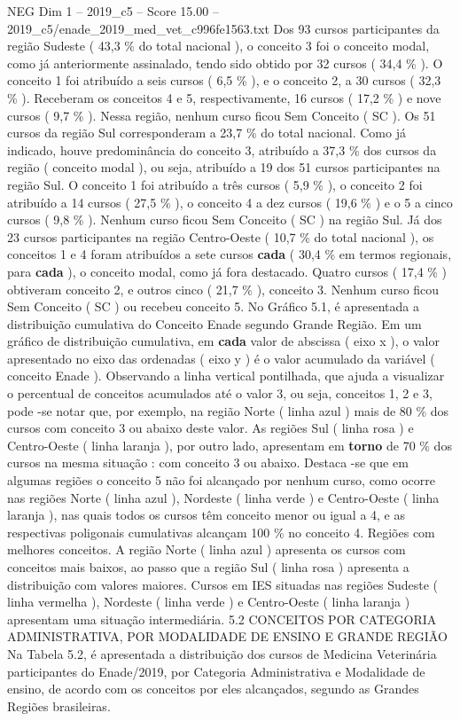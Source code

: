 \begin{textsample}{NEG Dim 1 – 2019\_c5 – Score 15.00 – 2019\_c5/enade\_2019\_med\_vet\_c996fe1563.txt}
Dos 93 cursos participantes da região Sudeste ( 43,3 \% do total nacional ), o conceito 3 foi o conceito modal, como já anteriormente assinalado, tendo sido obtido por 32 cursos ( 34,4 \% ).
O conceito 1 foi atribuído a seis cursos ( 6,5 \% ), e o conceito 2, a 30 cursos ( 32,3 \% ).
Receberam os conceitos 4 e 5, respectivamente, 16 cursos ( 17,2 \% ) e nove cursos ( 9,7 \% ).
Nessa região, nenhum curso ficou Sem Conceito ( SC ).
Os 51 cursos da região Sul corresponderam a 23,7 \% do total nacional.
Como já indicado, houve predominância do conceito 3, atribuído a 37,3 \% dos cursos da região ( conceito modal ), ou seja, atribuído a 19 dos 51 cursos participantes na região Sul.
O conceito 1 foi atribuído a três cursos ( 5,9 \% ), o conceito 2 foi atribuído a 14 cursos ( 27,5 \% ), o conceito 4 a dez cursos ( 19,6 \% ) e o 5 a cinco cursos ( 9,8 \% ).
Nenhum curso ficou Sem Conceito ( SC ) na região Sul.
Já dos 23 cursos participantes na região Centro-Oeste ( 10,7 \% do total nacional ), os conceitos 1 e 4 foram atribuídos a sete cursos \textbf{cada} ( 30,4 \% em termos regionais, para \textbf{cada} ), o conceito modal, como já fora destacado.
Quatro cursos ( 17,4 \% ) obtiveram conceito 2, e outros cinco ( 21,7 \% ), conceito 3.
Nenhum curso ficou Sem Conceito ( SC ) ou recebeu conceito 5.
No Gráfico 5.1, é apresentada a distribuição cumulativa do Conceito Enade segundo Grande Região.
Em um gráfico de distribuição cumulativa, em \textbf{cada} valor de abscissa ( eixo x ), o valor apresentado no eixo das ordenadas ( eixo y ) é o valor acumulado da variável ( conceito Enade ).
Observando a linha vertical pontilhada, que ajuda a visualizar o percentual de conceitos acumulados até o valor 3, ou seja, conceitos 1, 2 e 3, pode -se notar que, por exemplo, na região Norte ( linha azul ) mais de 80 \% dos cursos com conceito 3 ou abaixo deste valor.
As regiões Sul ( linha rosa ) e Centro-Oeste ( linha laranja ), por outro lado, apresentam em \textbf{torno} de 70 \% dos cursos na mesma situação : com conceito 3 ou abaixo.
Destaca -se que em algumas regiões o conceito 5 não foi alcançado por nenhum curso, como ocorre nas regiões Norte ( linha azul ), Nordeste ( linha verde ) e Centro-Oeste ( linha laranja ), nas quais todos os cursos têm conceito menor ou igual a 4, e as respectivas poligonais cumulativas alcançam 100 \% no conceito 4.
Regiões com melhores conceitos.
A região Norte ( linha azul ) apresenta os cursos com conceitos mais baixos, ao passo que a região Sul ( linha rosa ) apresenta a distribuição com valores maiores.
Cursos em IES situadas nas regiões Sudeste ( linha vermelha ), Nordeste ( linha verde ) e Centro-Oeste ( linha laranja ) apresentam uma situação intermediária. 5.2 CONCEITOS POR CATEGORIA ADMINISTRATIVA, POR MODALIDADE DE ENSINO E GRANDE REGIÃO Na Tabela 5.2, é apresentada a distribuição dos cursos de Medicina Veterinária participantes do Enade/2019, por Categoria Administrativa e Modalidade de ensino, de acordo com os conceitos por eles alcançados, segundo as Grandes Regiões brasileiras.

\end{textsample}
